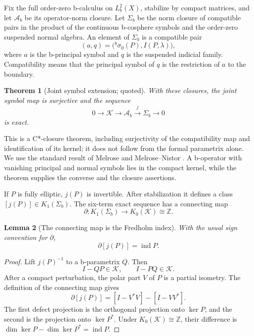 \documentclass[12pt,oneside,reqno]{article}
\theoremstyle{plain}
\newtheorem{theorem}{Theorem}[section]
\newtheorem{lemma}[theorem]{Lemma}
\theoremstyle{definition}
\theoremstyle{remark}
\begin{document}
Fix the full order-zero b-calculus on \(L_b^2(X)\), stabilize by compact
matrices, and let \(\mathcal A_b\) be its operator-norm closure. Let
\(\Sigma_b\) be the norm closure of compatible pairs in the product of
the continuous b-cosphere symbols and the order-zero suspended normal
algebra.
An element of \(\Sigma_b\) is a compatible pair
\[
 (a,q)=
 \bigl({}^b\sigma_0(P),I(P,\lambda)\bigr),
\]
where \(a\) is the b-principal symbol and \(q\) is the suspended indicial
family. Compatibility means that the principal symbol of \(q\) is the
restriction of \(a\) to the boundary.

\begin{theorem}[Joint symbol extension; quoted]
With these closures, the joint symbol map is surjective and the sequence
\[
 0\longrightarrow\mathcal K
 \longrightarrow\mathcal A_b
 \xrightarrow{\,j\,}\Sigma_b
 \longrightarrow0
\]
is exact.
\end{theorem}

This is a C*-closure theorem, including surjectivity of the compatibility
map and identification of its kernel; it does not follow from the formal
parametrix alone. We use the standard result of Melrose and
Melrose--Nistor \cite{Melrose,MNCstar}. A b-operator with vanishing principal
and normal symbols lies in the compact kernel, while the theorem supplies
the converse and the closure assertions.

If \(P\) is fully elliptic, \(j(P)\) is invertible. After stabilization it
defines a class \([j(P)]\in K_1(\Sigma_b)\). The six-term exact sequence
has a connecting map
\[
 \partial:K_1(\Sigma_b)\longrightarrow
 K_0(\mathcal K)\cong\mathbb Z.
\]

\begin{lemma}[The connecting map is the Fredholm index]
With the usual sign convention for \(\partial\),
\[
 \partial[j(P)]=\operatorname{ind}P.
\]
\end{lemma}

\begin{proof}
Lift \(j(P)^{-1}\) to a b-parametrix \(Q\). Then
\[
 I-QP\in\mathcal K,\qquad I-PQ\in\mathcal K.
\]
After a compact perturbation, the polar part \(V\) of \(P\) is a partial
isometry. The definition of the connecting map gives
\[
 \partial[j(P)]
 =[I-V^*V]-[I-VV^*].
\]
The first defect projection is the orthogonal projection onto
\(\ker P\), and the second is the projection onto \(\ker P^*\). Under
\(K_0(\mathcal K)\cong\mathbb Z\), their difference is
\(\dim\ker P-\dim\ker P^*=\operatorname{ind}P\).
\end{proof}
\end{document}
